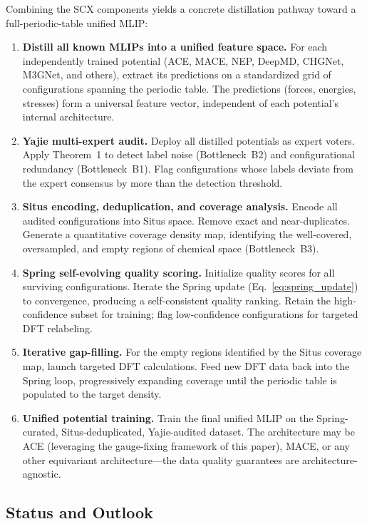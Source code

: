 \documentclass[twoside,prb,aps,floatfix,superscriptaddress,longbibliography]{revtex4-2}
\begin{document}
Combining the SCX components yields a concrete distillation pathway toward a full-periodic-table unified MLIP:

\begin{enumerate}[label=\textbf{Stage \arabic*:}]
    \item \textbf{Distill all known MLIPs into a unified feature space.} For each independently trained potential (ACE, MACE, NEP, DeepMD, CHGNet, M3GNet, and others), extract its predictions on a standardized grid of configurations spanning the periodic table. The predictions (forces, energies, stresses) form a universal feature vector, independent of each potential's internal architecture.
    \item \textbf{Yajie multi-expert audit.} Deploy all distilled potentials as expert voters. Apply Theorem~1 to detect label noise (Bottleneck~B2) and configurational redundancy (Bottleneck~B1). Flag configurations whose labels deviate from the expert consensus by more than the detection threshold.
    \item \textbf{Situs encoding, deduplication, and coverage analysis.} Encode all audited configurations into Situs space. Remove exact and near-duplicates. Generate a quantitative coverage density map, identifying the well-covered, oversampled, and empty regions of chemical space (Bottleneck~B3).
    \item \textbf{Spring self-evolving quality scoring.} Initialize quality scores for all surviving configurations. Iterate the Spring update (Eq.~\ref{eq:spring_update}) to convergence, producing a self-consistent quality ranking. Retain the high-confidence subset for training; flag low-confidence configurations for targeted DFT relabeling.
    \item \textbf{Iterative gap-filling.} For the empty regions identified by the Situs coverage map, launch targeted DFT calculations. Feed new DFT data back into the Spring loop, progressively expanding coverage until the periodic table is populated to the target density.
    \item \textbf{Unified potential training.} Train the final unified MLIP on the Spring-curated, Situs-deduplicated, Yajie-audited dataset. The architecture may be ACE (leveraging the gauge-fixing framework of this paper), MACE, or any other equivariant architecture---the data quality guarantees are architecture-agnostic.
\end{enumerate}

\subsection{Status and Outlook}
\end{document}
